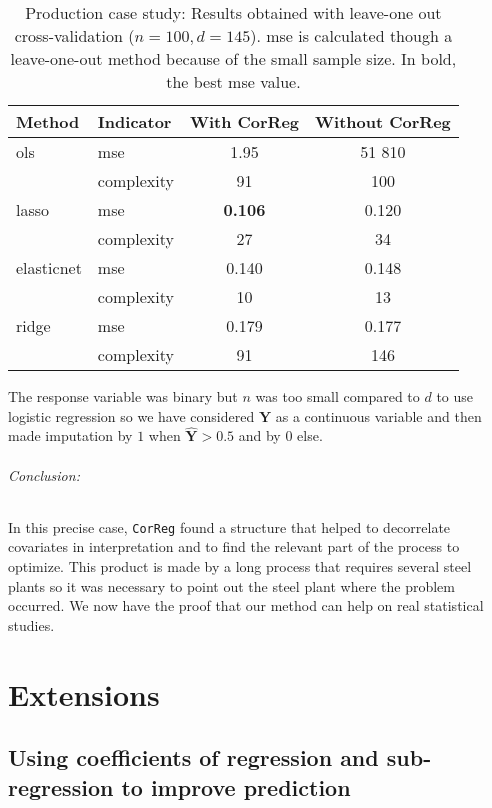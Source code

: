 \documentclass[12pt,a4paper]{report}
\begin{document}
\begin{table}[h!]
\centering
\begin{tabular}{llcc}
	\hline 
	Method& Indicator& With {\sc CorReg} & Without {\sc CorReg} \\ 
	\hline\hline
	{\sc ols} &  {\sc mse}& 1.95& 51 810\\
		& complexity & 91& 100 \\
	\hline 
		{\sc lasso} & {\sc mse} & {\bf 0.106} & 0.120\\
		& complexity & 27&34\\
	\hline 
		elasticnet & {\sc mse} &0.140 &0.148\\
		& complexity &10 &13\\
	\hline 
		ridge & {\sc mse} & 0.179 & 0.177\\
		& complexity &91 &146\\
	\hline 
\end{tabular} 
\caption{Production case study: Results obtained with leave-one out cross-validation ($n=100, d=145$). {\sc mse} is calculated though a leave-one-out method because of the small sample size. In bold, the best {\sc mse} value.}	\label{Res_prod}
\end{table}
The response variable was binary but $n$ was too small compared to $d$ to use logistic regression so we have considered $\boldsymbol{Y}$ as a continuous variable and then made imputation by $1$ when $\hat{\boldsymbol{Y}}>0.5$ and by $0$ else.\\

\paragraph{Conclusion:}In this precise case, {\tt CorReg} found a structure that helped to decorrelate covariates in interpretation and to find the relevant part of the process to optimize. This product is made by a long process that requires several steel plants so it was necessary to point out the steel plant where the problem occurred. We now have the proof that our method can help on real statistical studies.


\part{Extensions}	
			
		
\chapter{Using coefficients of regression and sub-regression to improve prediction}\label{chapplugin}
\end{document}
